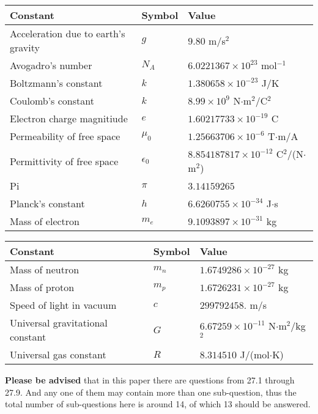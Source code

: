 \documentclass[12pt]{article}
\begin{document}
\noindent\begin{tabular}{|l|l|l|}
\hline
Constant & Symbol & Value \\
\hline
Acceleration due to earth's gravity &
$g$ &
 $ 9.80 $
m/s$^2$ \\
\hline
Avogadro's number &
$N_A$ &
 $ 6.0221367 \times 10^{23} $
mol$^{-1}$ \\
\hline
Boltzmann's constant &
$k$ &
 $ 1.380658 \times 10^{-23} $
J/K \\
\hline
Coulomb's constant &
$k$ &
 $ 8.99 \times 10^{9} $
N$\cdot $m$^2$/C$^2$ \\
\hline
Electron charge magnitiude &
$e$ &
 $ 1.60217733 \times 10^{-19} $
C \\
\hline
Permeability of free space &
$\mu _0$ &
 $ 1.25663706 \times 10^{-6} $
T$\cdot $m/A \\
\hline
Permittivity of free space &
$\epsilon _0$ &
 $ 8.854187817 \times 10^{-12} $
C$^2$/(N$\cdot $m$^2$) \\
\hline
Pi &
$\pi$ &
 $ 3.14159265 $
$ $ \\
\hline
Planck's constant &
$h$ &
 $ 6.6260755 \times 10^{-34} $
J$\cdot $s \\
\hline
Mass of electron &
$m_e$ &
 $ 9.1093897 \times 10^{-31} $
kg \\
\hline
\end{tabular}
 
 
\noindent\begin{tabular}{|l|l|l|}
\hline
Constant & Symbol & Value \\
\hline
Mass of neutron &
$m_n$ &
 $ 1.6749286 \times 10^{-27} $
kg \\
\hline
Mass of proton &
$m_p$ &
 $ 1.6726231 \times 10^{-27} $
kg \\
\hline
Speed of light in vacuum &
$c$ &
 $ 299792458. $
m/s \\
\hline
Universal gravitational constant &
$G$ &
 $ 6.67259 \times 10^{-11} $
N$\cdot $m$^2$/kg$^2$ \\
\hline
Universal gas constant &
$R$ &
 $ 8.314510 $
J/(mol$\cdot $K) \\
\hline
\end{tabular}
 
 
{\textbf{\large{Please be advised}}} that in this paper there are questions from
27.1 through
27.9.
And any one of them may contain more than one sub-question, thus the total number
of sub-questions here is around 14, of which
13 should be answered.
 
\vspace{0.3in}
 
\end{document}

